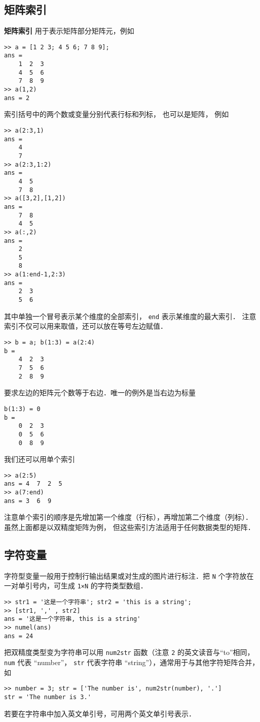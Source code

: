 \subsection{矩阵索引}

\textbf{矩阵索引} 用于表示矩阵部分矩阵元，例如
\begin{lstlisting}[language=MatlabCom]
>> a = [1 2 3; 4 5 6; 7 8 9];
ans =
    1  2  3
    4  5  6
    7  8  9
>> a(1,2)
ans = 2
\end{lstlisting}
索引括号中的两个数或变量分别代表行标和列标， 也可以是矩阵， 例如
\begin{lstlisting}[language=MatlabCom]
>> a(2:3,1)
ans =
    4
    7
>> a(2:3,1:2)
ans =
    4  5
    7  8
>> a([3,2],[1,2])
ans =
    7  8
    4  5
>> a(:,2)
ans =
    2
    5
    8
>> a(1:end-1,2:3)
ans =
    2  3
    5  6
\end{lstlisting}
其中单独一个冒号表示某个维度的全部索引， \lstinline|end| 表示某维度的最大索引． 注意索引不仅可以用来取值，还可以放在等号左边赋值．
\begin{lstlisting}[language=MatlabCom]
>> b = a; b(1:3) = a(2:4)
b =
    4  2  3
    7  5  6
    2  8  9
\end{lstlisting}
要求左边的矩阵元个数等于右边．唯一的例外是当右边为标量
\begin{lstlisting}[language=MatlabCom]
b(1:3) = 0
b =
    0  2  3
    0  5  6
    0  8  9 
\end{lstlisting}
我们还可以用单个索引 %
\begin{lstlisting}[language=MatlabCom]
>> a(2:5)
ans = 4  7  2  5
>> a(7:end)
ans = 3  6  9
\end{lstlisting}
注意单个索引的顺序是先增加第一个维度（行标），再增加第二个维度（列标）． 虽然上面都是以双精度矩阵为例， 但这些索引方法适用于任何数据类型的矩阵．

\subsection{字符变量}

字符型变量一般用于控制行输出结果或对生成的图片进行标注．把 \lstinline|N| 个字符放在一对单引号内，可生成 \lstinline|1×N| 的字符类型数组．
\begin{lstlisting}[language=MatlabCom]
>> str1 = '这是一个字符串'; str2 = 'this is a string';
>> [str1, ',' , str2]
ans = '这是一个字符串, this is a string'
>> numel(ans)
ans = 24
\end{lstlisting}
把双精度类型变为字符串可以用 \lstinline|num2str| 函数（注意 \lstinline|2| 的英文读音与“to”相同， \lstinline|num| 代表 “number”， \lstinline|str| 代表字符串 “string”），通常用于与其他字符矩阵合并，如
\begin{lstlisting}[language=MatlabCom]
>> number = 3; str = ['The number is', num2str(number), '.']
str = 'The number is 3.'
\end{lstlisting}
若要在字符串中加入英文单引号，可用两个英文单引号表示．

